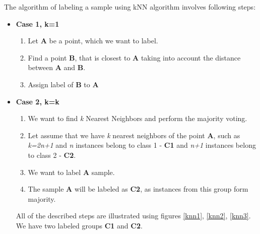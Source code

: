 	The algorithm of labeling a sample using kNN algorithm involves following steps:
	\begin{itemize}
		\item \textbf{Case 1, k=1}

	\begin{enumerate}
		\item Let \textbf{A} be a point, which we want to label.
		\item Find a point \textbf{B}, that is closest to \textbf{A} taking into account the distance between \textbf{A} and \textbf{B}.
		\item Assign label of \textbf{B} to \textbf{A}
		
	\end{enumerate}
	
		\item \textbf{Case 2, k=k}
		\begin{enumerate}
			\item We want to find \textit{k} Nearest Neighbors and perform the majority voting.
			\item Let assume that we have \textit{k} nearest neighbors of the point \textbf{A}, such as \textit{k=2n+1} and \textit{n} instances belong to class 1 - \textbf{C1} and \textit{n+1} instances belong to class 2 - \textbf{C2}.
			\item We want to label \textbf{A} sample.
			\item The sample \textbf{A} will be labeled as \textbf{C2}, as instances from this group form majority.
		\end{enumerate}
		All of the described steps are illustrated using figures \ref{knn1}, \ref{knn2}, \ref{knn3}.
		We have two labeled groups \textbf{C1} and \textbf{C2}. 
		 

\end{itemize}
